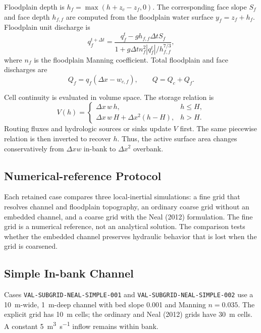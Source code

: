 \documentclass[11pt]{article}
\begin{document}
Floodplain depth is $h_f=\max(h+z_c-z_f,0)$. The corresponding face slope $S_f$ and face depth $h_{f,f}$ are computed from the floodplain water surface $y_f=z_f+h_f$. Floodplain unit discharge is
\begin{equation}
q_f^{t+\Delta t}=\frac{q_f^t-gh_{f,f}\Delta t S_f}
{1+g\Delta t n_f^2|q_f^t|/h_{f,f}^{7/3}},
\end{equation}
where $n_f$ is the floodplain Manning coefficient. Total floodplain and face discharges are
\begin{equation}
Q_f=q_f(\Delta x-w_{c,f}),
\qquad Q=Q_c+Q_f.
\end{equation}

Cell continuity is evaluated in volume space. The storage relation is
\begin{equation}
V(h)=
\begin{cases}
\Delta x\,w\,h, & h\le H,\\
\Delta x\,w\,H+\Delta x^2(h-H), & h>H.
\end{cases}
\end{equation}
Routing fluxes and hydrologic sources or sinks update $V$ first. The same piecewise relation is then inverted to recover $h$. Thus, the active surface area changes conservatively from $\Delta xw$ in-bank to $\Delta x^2$ overbank.

\subsection{Numerical-reference Protocol}
Each retained case compares three local-inertial simulations: a fine grid that resolves channel and floodplain topography, an ordinary coarse grid without an embedded channel, and a coarse grid with the Neal (2012) formulation. The fine grid is a numerical reference, not an analytical solution. The comparison tests whether the embedded channel preserves hydraulic behavior that is lost when the grid is coarsened.

\subsection{Simple In-bank Channel}
Cases \texttt{VAL-SUBGRID-NEAL-SIMPLE-001} and \texttt{VAL-SUBGRID-NEAL-SIMPLE-002} use a \SI{10}{\meter}-wide, \SI{1}{\meter}-deep channel with bed slope 0.001 and Manning $n=0.035$. The explicit grid has \SI{10}{\meter} cells; the ordinary and Neal (2012) grids have \SI{30}{\meter} cells. A constant \SI{5}{\cubic\meter\per\second} inflow remains within bank.
\end{document}
